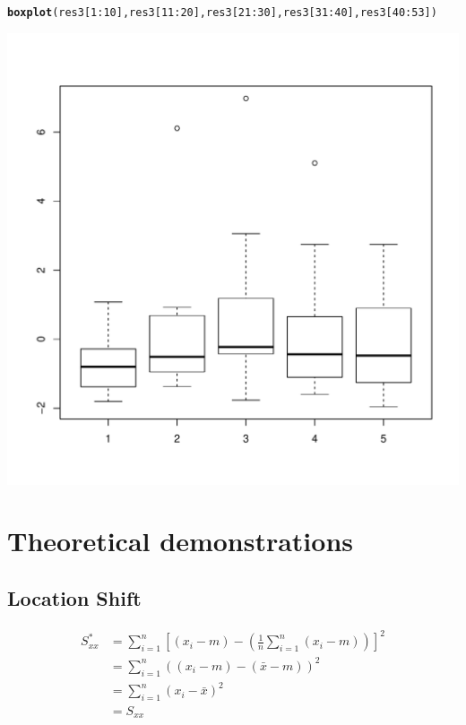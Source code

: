 \documentclass{article}\usepackage[]{graphicx}\usepackage[]{color}
\makeatletter
\def\maxwidth{ %
  \ifdim\Gin@nat@width>\linewidth
    \linewidth
  \else
    \Gin@nat@width
  \fi
}
\newcommand{\hlnum}[1]{\textcolor[rgb]{0.686,0.059,0.569}{#1}}%
\newcommand{\hlopt}[1]{\textcolor[rgb]{0,0,0}{#1}}%
\newcommand{\hlstd}[1]{\textcolor[rgb]{0.345,0.345,0.345}{#1}}%
\newcommand{\hlkwd}[1]{\textcolor[rgb]{0.737,0.353,0.396}{\textbf{#1}}}%
\newenvironment{kframe}{%
 \def\at@end@of@kframe{}%
 \ifinner\ifhmode%
  \def\at@end@of@kframe{\end{minipage}}%
  \begin{minipage}{\columnwidth}%
 \fi\fi%
 \def\FrameCommand##1{\hskip\@totalleftmargin \hskip-\fboxsep
 \colorbox{shadecolor}{##1}\hskip-\fboxsep
     \hskip-\linewidth \hskip-\@totalleftmargin \hskip\columnwidth}%
 \MakeFramed {\advance\hsize-\width
   \@totalleftmargin\z@ \linewidth\hsize
   \@setminipage}}%
 {\par\unskip\endMakeFramed%
 \at@end@of@kframe}
\newenvironment{knitrout}{}{} %
\makeatother
\begin{document}
\clearpage

\begin{knitrout}
\color{fgcolor}\begin{kframe}
\begin{alltt}
\hlkwd{boxplot}\hlstd{(res3[}\hlnum{1}\hlopt{:}\hlnum{10}\hlstd{],res3[}\hlnum{11}\hlopt{:}\hlnum{20}\hlstd{],res3[}\hlnum{21}\hlopt{:}\hlnum{30}\hlstd{],res3[}\hlnum{31}\hlopt{:}\hlnum{40}\hlstd{],res3[}\hlnum{40}\hlopt{:}\hlnum{53}\hlstd{])}
\end{alltt}
\end{kframe}
\includegraphics[width=\maxwidth]{figure/unnamed-chunk-9-1} 

\end{knitrout}


\section{Theoretical demonstrations}
\subsection{Location Shift}

	\begin{align*}
		S_{xx} ^* &= \sum_{i=1}^{n}\left[(x_i - m) - (\frac{1}{n}\sum_{i=1}^{n} (x_i- m)) \right]^2  \\
		&= \sum_{i=1}^{n}((x_i - m) - (\bar{x} - m))^2\\
		&= \sum_{i=1}^{n}(x_i -\bar{x})^2 \\
		&= S_{xx}
	\end{align*}
	
\end{document}
